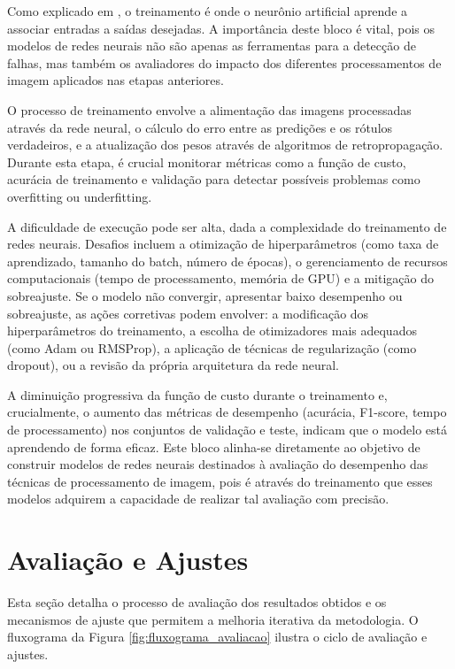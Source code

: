 Como explicado em , o treinamento é onde o neurônio artificial aprende a associar entradas a saídas desejadas. A importância deste bloco é vital, pois os modelos de redes neurais não são apenas as ferramentas para a detecção de falhas, mas também os avaliadores do impacto dos diferentes processamentos de imagem aplicados nas etapas anteriores.

O processo de treinamento envolve a alimentação das imagens processadas através da rede neural, o cálculo do erro entre as predições e os rótulos verdadeiros, e a atualização dos pesos através de algoritmos de retropropagação. Durante esta etapa, é crucial monitorar métricas como a função de custo, acurácia de treinamento e validação para detectar possíveis problemas como overfitting ou underfitting.

A dificuldade de execução pode ser alta, dada a complexidade do treinamento de redes neurais. Desafios incluem a otimização de hiperparâmetros (como taxa de aprendizado, tamanho do batch, número de épocas), o gerenciamento de recursos computacionais (tempo de processamento, memória de GPU) e a mitigação do sobreajuste. Se o modelo não convergir, apresentar baixo desempenho ou sobreajuste, as ações corretivas podem envolver: a modificação dos hiperparâmetros do treinamento, a escolha de otimizadores mais adequados (como Adam ou RMSProp), a aplicação de técnicas de regularização (como dropout), ou a revisão da própria arquitetura da rede neural.

A diminuição progressiva da função de custo durante o treinamento e, crucialmente, o aumento das métricas de desempenho (acurácia, F1-score, tempo de processamento) nos conjuntos de validação e teste, indicam que o modelo está aprendendo de forma eficaz. Este bloco alinha-se diretamente ao objetivo de construir modelos de redes neurais destinados à avaliação do desempenho das técnicas de processamento de imagem, pois é através do treinamento que esses modelos adquirem a capacidade de realizar tal avaliação com precisão.

\section{Avaliação e Ajustes}

Esta seção detalha o processo de avaliação dos resultados obtidos e os mecanismos de ajuste que permitem a melhoria iterativa da metodologia. O fluxograma da Figura \ref{fig:fluxograma_avaliacao} ilustra o ciclo de avaliação e ajustes.

